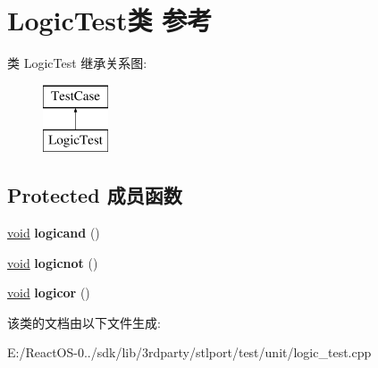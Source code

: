 \hypertarget{class_logic_test}{}\section{Logic\+Test类 参考}
\label{class_logic_test}
类 Logic\+Test 继承关系图\+:\begin{figure}[H]
\begin{center}
\leavevmode
\includegraphics[height=2.000000cm]{class_logic_test}
\end{center}
\end{figure}
\subsection*{Protected 成员函数}
\begin{DoxyCompactItemize}
\item 
\mbox{\label{class_logic_test_ab75327d6a5f08f6f0c6688e2e02cafc6}} 
\hyperlink{interfacevoid}{void} {\bfseries logicand} ()
\item 
\mbox{\label{class_logic_test_a9cbb3b37d38cb29c30a3e09e098b7c85}} 
\hyperlink{interfacevoid}{void} {\bfseries logicnot} ()
\item 
\mbox{\label{class_logic_test_ab281308a354a72a9a6c41f51b5cc89ac}} 
\hyperlink{interfacevoid}{void} {\bfseries logicor} ()
\end{DoxyCompactItemize}


该类的文档由以下文件生成\+:\begin{DoxyCompactItemize}
\item 
E\+:/\+React\+O\+S-\/0../sdk/lib/3rdparty/stlport/test/unit/logic\+\_\+test.\+cpp\end{DoxyCompactItemize}
